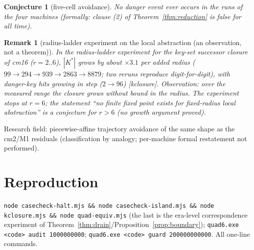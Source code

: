\documentclass[11pt]{amsart}
\newtheorem{remark}[theorem]{Remark}
\newtheorem{conjecture}[theorem]{Conjecture}
\begin{document}
\begin{conjecture}[five-cell avoidance]\label{conj:quad}
No danger event ever occurs in the runs of the four machines (formally: clause (2) of Theorem~\ref{thm:reduction} is false for all time).
\end{conjecture}

\begin{remark}[radius-ladder experiment on the local abstraction (an observation, not a theorem)]\label{rem:kclosure}
In the radius-ladder experiment for the key-set successor closure of cm16 ($r=2..6$), $|K^*|$ grows by about $\times3.1$ per added radius ($99\to294\to939\to2863\to8879$; two reruns reproduce digit-for-digit), with danger-key hits growing in step ($2\to96$) [kclosure]. \emph{Observation}: over the measured range the closure grows without bound in the radius. The experiment stops at $r=6$; the statement ``no finite fixed point exists for fixed-radius local abstraction'' is a \emph{conjecture} for $r>6$ (no growth argument proved).
\end{remark}

Research field: piecewise-affine trajectory avoidance of the same shape as the cm2/M1 residuals (classification by analogy; per-machine formal restatement not performed).

\section*{Reproduction}
\texttt{node casecheck-halt.mjs \&\& node casecheck-island.mjs \&\& node kclosure.mjs \&\& node quad-equiv.mjs} (the last is the era-level correspondence experiment of Theorem~\ref{thm:drain}/Proposition~\ref{prop:boundary}); \texttt{quad6.exe <code> audit 1000000000}; \texttt{quad6.exe <code> guard 200000000000}. All one-line commands.
\end{document}
